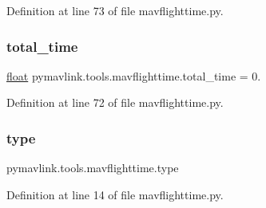 Definition at line 73 of file mavflighttime.\+py.

\mbox{\label{namespacepymavlink_1_1tools_1_1mavflighttime_a3ee5454b529e2f7f9985884461827257}} 
\subsubsection{\texorpdfstring{total\_time}{total\_time}}
{\footnotesize\ttfamily \mbox{\hyperlink{namespacepymavlink_1_1tools_1_1mavflighttime_ab1fedea2ca1882ff7e060f44f8048885}{float}} pymavlink.\+tools.\+mavflighttime.\+total\+\_\+time = 0.}



Definition at line 72 of file mavflighttime.\+py.

\mbox{\label{namespacepymavlink_1_1tools_1_1mavflighttime_ab9aeb28d56aee4aa9d335cded64123ec}} 
\subsubsection{\texorpdfstring{type}{type}}
{\footnotesize\ttfamily pymavlink.\+tools.\+mavflighttime.\+type}



Definition at line 14 of file mavflighttime.\+py.

